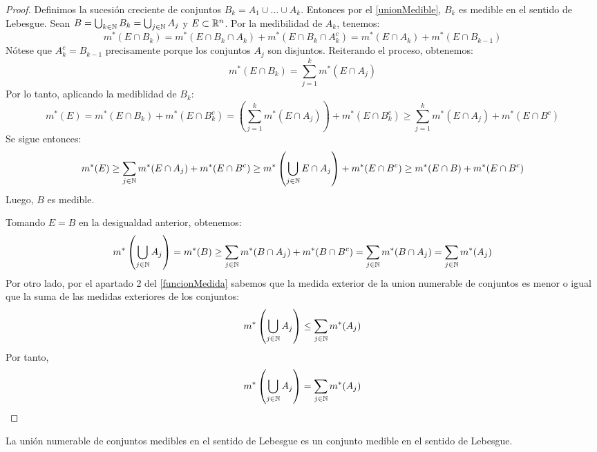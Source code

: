 \begin{proof}
    Definimos la sucesión creciente de conjuntos \( B_k = A_1 \cup \ldots \cup A_k \). Entonces por el \cref{unionMedible}, \( B_k \) es medible en el sentido de Lebesgue. Sean \( B = \bigcup_{k \in \mathbb{N}} B_k = \bigcup_{j \in \mathbb{N}} A_j \) y \( E \subset \mathbb{R}^n \). Por la medibilidad de $A_k$, tenemos:
    \[
        m^*(E \cap B_k) = m^*(E \cap B_k \cap A_k) + m^*(E \cap B_k \cap A_k^c) = m^*(E \cap A_k) + m^*(E \cap B_{k-1})
    \]
    Nótese que $A_k^c = B_{k-1}$ precisamente porque los conjuntos $A_j$ son
    disjuntos. Reiterando el proceso, obtenemos:
    \[
        m^*(E \cap B_k) = \sum_{j=1}^k m^*(E \cap A_j)
    \]
    Por lo tanto, aplicando la mediblidad de \( B_k \):
    \[
        m^*(E) = m^*(E \cap B_k) + m^*(E \cap B_k^c) = \left( \sum_{j=1}^k m^*(E \cap A_j) \right) + m^*(E \cap B_k^c) \geq \sum_{j=1}^k m^*(E \cap A_j) + m^*(E \cap B^c)
    \]
    Se sigue entonces:
    \[
        m^*(E) \geq \sum_{j \in \mathbb{N}} m^*(E \cap A_j) + m^*(E \cap B^c) \geq m^*\left( \bigcup_{j \in \mathbb{N}} E \cap A_j \right) + m^*(E \cap B^c) \geq m^*(E \cap B) + m^*(E \cap B^c)
    \]
    Luego, \( B \) es medible.

    Tomando \( E = B \) en la desigualdad anterior, obtenemos:
    \[
        m^*\left( \bigcup_{j \in \mathbb{N}} A_j \right) = m^*(B) \geq \sum_{j \in \mathbb{N}} m^*(B \cap A_j) + m^*(B \cap B^c) = \sum_{j \in \mathbb{N}} m^*(B \cap A_j) = \sum_{j \in \mathbb{N}} m^*(A_j)
    \]
    Por otro lado, por el apartado 2 del \cref{funcionMedida} sabemos que la medida
    exterior de la union numerable de conjuntos es menor o igual que la suma de las
    medidas exteriores de los conjuntos:
    \[
        m^*\left( \bigcup_{j \in \mathbb{N}} A_j \right) \leq \sum_{j \in \mathbb{N}} m^*(A_j)
    \]
    Por tanto,
    \[
        m^*\left( \bigcup_{j \in \mathbb{N}} A_j \right) = \sum_{j \in \mathbb{N}} m^*(A_j)
    \]
\end{proof}

\begin{lema}
    La unión numerable de conjuntos medibles en el sentido de Lebesgue es un conjunto medible en el sentido de Lebesgue.
\end{lema}

